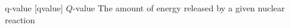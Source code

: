\newglsXterm%
{q-value}%
[qvalue]%
{{}$Q${\--}value}%
{The amount of energy released by a given nuclear reaction}%